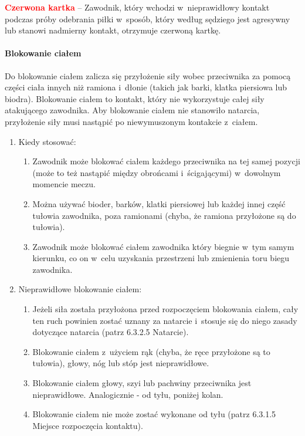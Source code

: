 \documentclass[12pt]{article}
\newcommand\redcard[1]{\bgroup\textcolor{red}{\textbf{#1}}}
\begin{document}
\redcard{Czerwona kartka} -- Zawodnik, który wchodzi w~nieprawidłowy kontakt
podczas próby odebrania piłki w~sposób, który według sędziego jest
agresywny lub stanowi nadmierny kontakt, otrzymuje czerwoną kartkę.

\paragraph{Blokowanie ciałem}
Do blokowanie ciałem zalicza się
przyłożenie siły wobec przeciwnika za pomocą części ciała innych niż
ramiona i~dłonie (takich jak barki, klatka piersiowa lub biodra).
Blokowanie ciałem to kontakt, który nie wykorzystuje całej siły
atakującego zawodnika. Aby blokowanie ciałem nie stanowiło natarcia,
przyłożenie siły musi nastąpić po niewymuszonym kontakcie z~ciałem.

\begin{enumerate}
	\item
	      Kiedy stosować:

	      \begin{enumerate}
		      \item
		            Zawodnik może blokować ciałem każdego przeciwnika na tej samej
		            pozycji (może to też nastąpić między obrońcami i~ścigającymi) w~dowolnym momencie meczu.
		      \item
		            Można używać bioder, barków, klatki piersiowej lub każdej innej
		            część tułowia zawodnika, poza ramionami (chyba, że ramiona
		            przyłożone są do tułowia).
		      \item
		            Zawodnik może blokować ciałem zawodnika który biegnie w~tym samym
		            kierunku, co on w~celu uzyskania przestrzeni lub zmienienia toru
		            biegu zawodnika.
	      \end{enumerate}
	\item
	      Nieprawidłowe blokowanie ciałem:

	      \begin{enumerate}
		      \item
		            Jeżeli siła została przyłożona przed rozpoczęciem blokowania ciałem,
		            cały ten ruch powinien zostać uznany za natarcie i~stosuje się do
		            niego zasady dotyczące natarcia (patrz 6.3.2.5 Natarcie).
		      \item
		            Blokowanie ciałem z~użyciem rąk (chyba, że ręce przyłożone są to
		            tułowia), głowy, nóg lub stóp jest nieprawidłowe.
		      \item
		            Blokowanie ciałem głowy, szyi lub pachwiny przeciwnika jest
		            nieprawidłowe. Analogicznie - od tyłu, poniżej kolan.
		      \item
		            Blokowanie ciałem nie może zostać wykonane od tyłu (patrz 6.3.1.5
		            Miejsce rozpoczęcia kontaktu).
	      \end{enumerate}
\end{enumerate}
\end{document}
